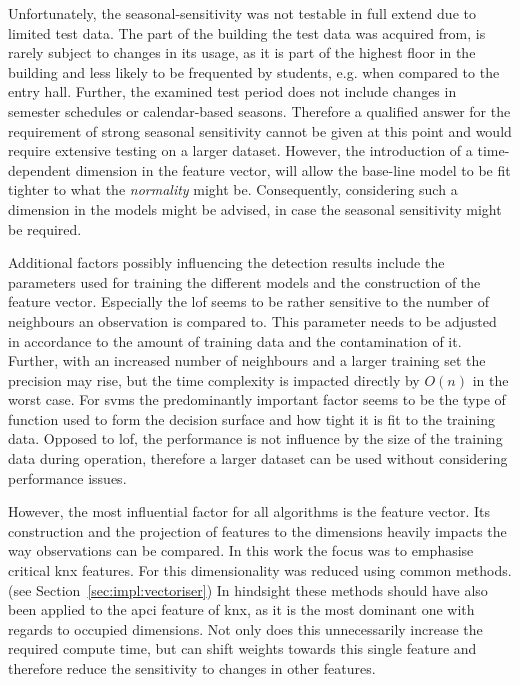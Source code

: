 Unfortunately, the seasonal-sensitivity was not testable in full extend due to limited test data.
The part of the building the test data was acquired from, is rarely subject to changes in its usage, as it is part of the highest floor in the building and less likely to be frequented by students, e.g. when compared to the entry hall.
Further, the examined test period does not include changes in semester schedules or calendar-based seasons.
Therefore a qualified answer for the requirement of strong seasonal sensitivity cannot be given at this point and would require extensive testing on a larger dataset.
However, the introduction of a time-dependent dimension in the feature vector, will allow the base-line model to be fit tighter to what the \emph{normality} might be. Consequently, considering such a dimension in the models might be advised, in case the seasonal sensitivity might be required.

Additional factors possibly influencing the detection results include the parameters used for training the different models and the construction of the feature vector.
Especially the \gls{lof} seems to be rather sensitive to the number of neighbours an observation is compared to. This parameter needs to be adjusted in accordance to the amount of training data and the contamination of it. Further, with an increased number of neighbours and a larger training set the precision may rise, but the time complexity is impacted directly by \(O(n)\) in the worst case.
For \glspl{svm} the predominantly important factor seems to be the type of function used to form the decision surface and how tight it is fit to the training data. Opposed to \gls{lof}, the performance is not influence by the size of the training data during operation, therefore a larger dataset can be used without considering performance issues.

However, the most influential factor for all algorithms is the feature vector.
Its construction and the projection of features to the dimensions heavily impacts the way observations can be compared.
In this work the focus was to emphasise critical \gls{knx} features. For this dimensionality was reduced using common methods. (see Section~\ref{sec:impl:vectoriser}) In hindsight these methods should have also been applied to the \gls{apci} feature of \gls{knx}, as it is the most dominant one with regards to occupied dimensions. Not only does this unnecessarily increase the required compute time, but can shift weights towards this single feature and therefore reduce the sensitivity to changes in other features.

